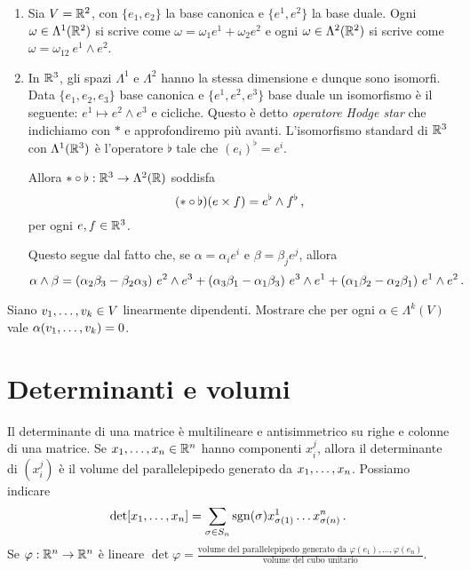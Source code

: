 \begin{example}
	\begin{enumerate}
		\item Sia $V = \R^2$, con $\{e_1,e_2\}$ la base canonica e $\{e^1,e^2\}$ la base duale. Ogni $\omega\in\Lambda^1(\R^2)$ si scrive come $\omega = \omega_1e^1+\omega_2e^2$ e ogni $\omega\in\Lambda^2(\R^2)$ si scrive come $\omega = \omega_{12}\ e^1\wedge e^2$. 
		
		\item In $\R^3$, gli spazi $\Lambda^1$ e $\Lambda^2$ hanno la stessa dimensione e dunque sono isomorfi. Data $\{e_1,e_2,e_3\}$ base canonica e $\{e^1,e^2,e^3\}$ base duale un isomorfismo è il seguente: $e^1\mapsto e^2\wedge e^3$ e cicliche.
		Questo è detto \emph{operatore Hodge star} che indichiamo con $*$ e approfondiremo più avanti. L'isomorfismo standard di $\R^3$ con $\Lambda^1(\R^3)$ è l'operatore $\flat$ tale che $(e_i)^\flat = e^i$. %
		
		Allora $*\circ \flat:\R^3\to \Lambda^2(\R)$ soddisfa
		\begin{equation*}
			(*\circ \flat) (e\times f) = e^\flat \wedge f^\flat \virgola
		\end{equation*}
		per ogni $e,f \in \R^3$.
		
		Questo segue dal fatto che, se $\alpha = \alpha_ie^i$ e $\beta = \beta_j e^j$, allora
		\begin{equation*}
			\alpha\wedge\beta = (\alpha_2\beta_3 - \beta_2\alpha_3)\ e^2\wedge e^3 + (\alpha_3\beta_1 - \alpha_1\beta_3)\ e^3\wedge e^1 + (\alpha_1\beta_2 - \alpha_2\beta_1)\ e^1\wedge e^2 \punto
		\end{equation*}
	\end{enumerate}
\end{example}

\begin{exercise}
	Siano $\seqb vk, \in V$ linearmente dipendenti. Mostrare che per ogni $\alpha\in\Lambda^k(V)$ vale $\alpha(\seqb vk,) = 0$. 
\end{exercise}


\section{Determinanti e volumi}

Il determinante di una matrice è multilineare e antisimmetrico su righe e colonne di una matrice.
Se $\seqb xn, \in\R^n$ hanno componenti $x_i^j$, allora il determinante di $(x_i^j)$ è il volume del parallelepipedo generato da $\seqb xn,$.
Possiamo indicare
\begin{equation*}
	\det[\seqb xn,] = \sum_{\sigma\in S_n} \sgn(\sigma) x_{\sigma(1)}^1\ldots x_{\sigma(n)}^n \punto
\end{equation*}
Se $\varphi:\R^n\to\R^n$ è lineare $\det\varphi = \frac{\text{volume del parallelepipedo generato da $\varphi(e_1),\ldots,\varphi(e_n)$}}{\text{volume del cubo unitario}}$.

